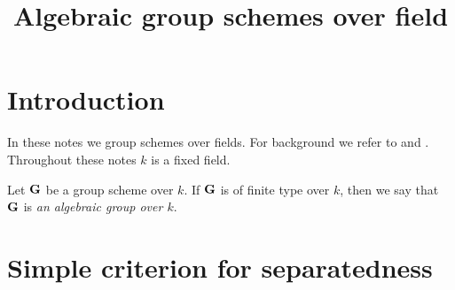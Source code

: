 


\title{Algebraic group schemes over field}
\date{}
\maketitle

\section{Introduction}
\noindent
In these notes we group schemes over fields. For background we refer to \cite{kfunctors} and \cite{Monoid_k_functors}.\\
Throughout these notes $k$ is a fixed field.

\begin{definition}
Let $\mathbf{G}$ be a group scheme over $k$. If $\mathbf{G}$ is of finite type over $k$, then we say that $\mathbf{G}$ is \textit{an algebraic group over $k$}.
\end{definition}

\section{Simple criterion for separatedness}

